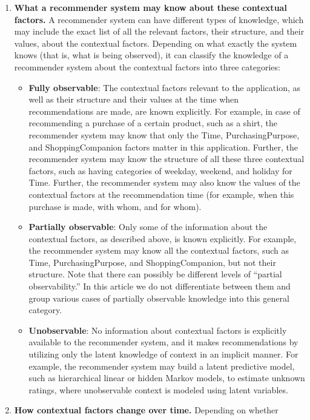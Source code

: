 \begin{enumerate}
\item \textbf{What a recommender system may know about these contextual factors.} 
A recommender system can have different types of knowledge, which may include 
the exact list of all the relevant factors, their structure, and their values, 
about the contextual factors. Depending on what exactly the system knows (that 
is, what is being observed), it can classify the knowledge of a recommender 
system about the contextual factors into three categories: 
	\begin{itemize}
	\item \textbf{Fully observable}: The contextual factors relevant to the 
	application, as well as their structure and their values at the time when 
	recommendations are made, are known explicitly. For example, in case 
	of recommending a purchase of a certain product, such as a shirt, the 
	recommender system may know that only the Time, PurchasingPurpose, and 
	ShoppingCompanion factors matter in this application. Further, the 
	recommender system may know the structure of all these three contextual 
	factors, such as having categories of weekday, weekend, and holiday for 
	Time. Further, the recommender system may also know the values of the 
	contextual factors at the recommendation time (for example, when this 
	purchase is made, with whom, and for whom).
	\item \textbf{Partially observable}: Only some of the information about 
	the contextual factors, as described above, is known explicitly. For example, 
	the recommender system may know all the contextual factors, such as Time, 
	PurchasingPurpose, and ShoppingCompanion, but not their structure. Note that 
	there can possibly be different levels of “partial observability.” In this 
	article we do not differentiate between them and group various cases of 
	partially observable knowledge into this general category.
	\item \textbf{Unobservable}: No information about contextual factors is 
	explicitly available to the recommender system, and it makes recommendations 
	by utilizing only the latent knowledge of context in an implicit manner. 
	For example, the recommender system may build a latent predictive model, 
	such as hierarchical linear or hidden Markov models, to estimate unknown 
	ratings, where unobservable context is modeled using latent variables.
	\end{itemize}
\item \textbf{How contextual factors change over time.} Depending on whether 

\end{enumerate}
